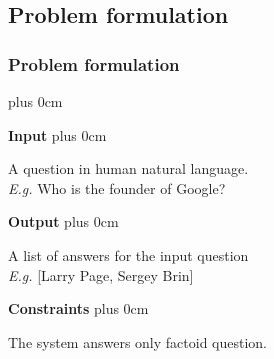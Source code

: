 \documentclass[11pt]{beamer}
\renewcommand{\raggedright}{\leftskip=0pt \rightskip=0pt plus 0cm}
\let\olditemize=\itemize
\renewenvironment{itemize}{\olditemize\raggedright}{\endlist}
\begin{document}
\subsection{Problem formulation}
\begin{frame}
\begin{adjustwidth}{-2em}{1em}
\frametitle{Problem formulation}
\begin{itemize}
	\item \textbf{Input} 
	\begin{itemize}
		\item A question in human natural language.\\[5pt]
		\textit{E.g.} Who is the founder of Google?
	\end{itemize}
	\item \textbf{Output}
	\begin{itemize}
		\item A list of answers for the input question \\[5pt]
		\textit{E.g.} [Larry Page, Sergey Brin]
	\end{itemize}
	\item \textbf{Constraints}
	\begin{itemize}
		\item The system answers only factoid question.
	\end{itemize}
\end{itemize}
\end{adjustwidth}
\end{frame}
\end{document}
